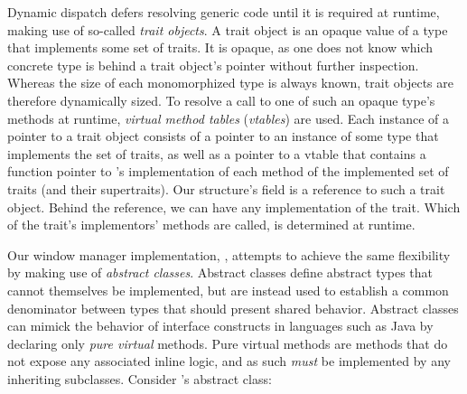 
Dynamic dispatch defers resolving generic code until it is required at
runtime, making use of so-called \textit{trait objects}\cite{therustbook,
rustdynamicdispatch}. A trait object is an opaque value of a type that
implements some set of traits\cite{therustreference}. It is opaque, as
one does not know which concrete type is behind a trait object's pointer
without further inspection\cite{therustreference}. Whereas the size of each
monomorphized type is always known, trait objects are therefore dynamically
sized\cite{therustreference}. To resolve a call to one of such an opaque
type's methods at runtime, \textit{virtual method tables} (\textit{vtables})
are used\cite{therustreference}. Each instance of a pointer to a trait object
consists of a pointer to an instance of some type  that implements the
set of traits, as well as a pointer to a vtable that contains a function pointer
to 's implementation of each method of the implemented set of traits
(and their supertraits)\cite{therustreference}. Our  structure's
 field is a reference to such a trait object. Behind the reference,
we can have any implementation of the  trait. Which of the
trait's implementors' methods are called, is determined at runtime.



Our \cpp window manager implementation, \wmcpp, attempts to achieve the same
flexibility by making use of \textit{abstract classes}. Abstract classes define
abstract types that cannot themselves be implemented, but are instead used
to establish a common denominator between types that should present shared
behavior. Abstract classes can mimick the behavior of interface constructs in
languages such as Java by declaring only \textit{pure virtual} methods. Pure
virtual methods are methods that do not expose any associated inline logic, and
as such \textit{must} be implemented by any inheriting subclasses. Consider
\wmcpp's  abstract class:


